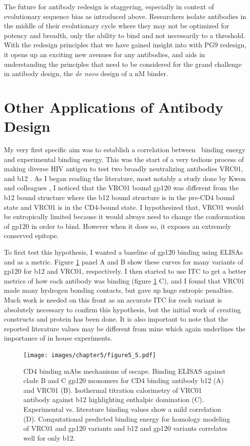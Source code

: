 The future for antibody redesign is staggering, especially in context of evolutionary sequence bias as introduced above. Researchers isolate antibodies in the middle of their evolutionary cycle where they may not be optimized for potency and breadth, only the ability to bind and not necessarily to a threshold. With the redesign principles that we have gained insight into with PG9 redesign, it opens up an exciting new avenues for any antibodies, and aids in understanding the principles that need to be considered for the grand challenge in antibody design, the \textit{de novo} design of a nM binder.

\section{Other Applications of Antibody Design}
My very first specific aim was to establish a correlation between \silico~binding energy and experimental binding energy. This was the start of a very tedious process of making diverse HIV antigen to test two broadly neutralizing antibodies VRC01, and b12 \citep{Wu:2009ks,Li:2011ea}. As I began reading the literature, most notably a study done by Kwon and colleagues \citep{Kwon:2012eo}, I noticed that the VRC01 bound gp120 was different from the b12 bound structure where the b12 bound structure is in the pre-CD4 bound state and VRC01 is in the CD4-bound state. I hypothesized that, VRC01 would be entropically limited because it would always need to change the conformation of gp120 in order to bind. However when it does so, it exposes an extremely conserved epitope.

To first test this hypothesis, I wanted a baseline of gp120 binding using ELISAs and \ec as a metric. Figure \ref{fig:fig5_5} panel A and B show these curves for many variants of gp120 for b12 and VRC01, respectively. I then started to use ITC to get a better metrics of how each antibody was binding (figure \ref{fig:fig5_5} C), and I found that VRC01 made many hydrogen bonding contacts, but gave up huge entropic penalties. Much work is needed on this front as an accurate ITC for each variant is absolutely necessary to confirm this hypothesis, but the initial work of creating constructs and protein has been done. It is also important to note that the reported literature values may be different from mine which again underlines the importance of in house experiments.

\begin{figure}[!t]
   \centering
   \texttt{[image: images/chapter5/figure5\_5.pdf]}
   \caption[CD4 Binding mAbs Mechanisms of Escape]{CD4 binding mAbs mechanisms of escape. Binding ELISAS against clade B and C gp120 monomers for CD4 binding antibody b12 (A) and VRC01 (B). Isothermal titration calorimetry of VRC01 antibody against b12 highlighting enthalpic domination (C). Experimental vs. literature binding values show a mild correlation (D). Computational predicted binding energy for homology modeling of VRC01 and gp120 variants and b12 and gp120 variants correlates well for only b12.}
    \label{fig:fig5_5}
\end{figure}


